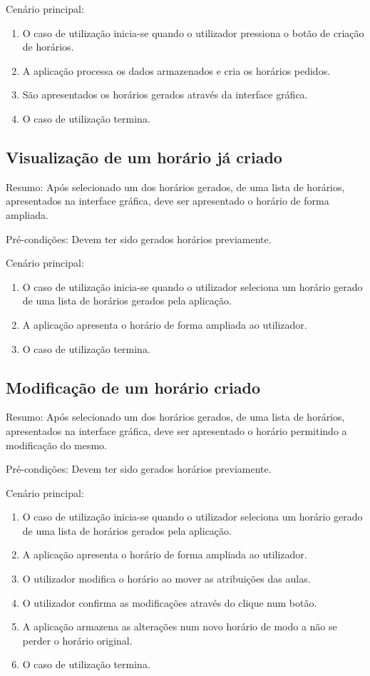 Cenário principal:

\begin{enumerate}
    \item O caso de utilização inicia-se quando o utilizador pressiona o botão de criação de horários.
    \item A aplicação processa os dados armazenados e cria os horários pedidos.
    \item São apresentados os horários gerados através da interface gráfica.
    \item O caso de utilização termina.
\end{enumerate}

\subsection{Visualização de um horário já criado}
Resumo: Após selecionado um dos horários gerados, de uma lista de horários, apresentados na interface gráfica, deve ser apresentado o horário de forma ampliada.

Pré-condições: Devem ter sido gerados horários previamente.

Cenário principal:

\begin{enumerate}
    \item O caso de utilização inicia-se quando o utilizador seleciona um horário gerado de uma lista de horários gerados pela aplicação.
    \item A aplicação apresenta o horário de forma ampliada ao utilizador.
    \item O caso de utilização termina.
\end{enumerate}

\subsection{Modificação de um horário criado}
Resumo: Após selecionado um dos horários gerados, de uma lista de horários, apresentados na interface gráfica, deve ser apresentado o horário permitindo a modificação do mesmo.

Pré-condições: Devem ter sido gerados horários previamente.

Cenário principal:

\begin{enumerate}
    \item O caso de utilização inicia-se quando o utilizador seleciona um horário gerado de uma lista de horários gerados pela aplicação.
    \item A aplicação apresenta o horário de forma ampliada ao utilizador.
    \item O utilizador modifica o horário ao mover as atribuições das aulas.
    \item O utilizador confirma as modificações através do clique num botão. \label{casos_util_5:confirmar_alteracoes}
    \item A aplicação armazena as alterações num novo horário de modo a não se perder o horário original.
    \item O caso de utilização termina.
\end{enumerate}

